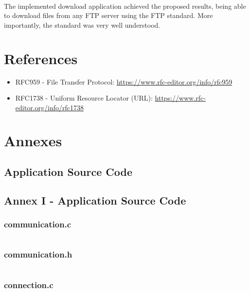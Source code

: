 \documentclass[11pt]{article}
\begin{document}
\paragraph{}The implemented download application achieved the proposed results, being able to download files from any FTP server using the FTP standard. More importantly, the standard was very well understood.

\section*{References}

\begin{itemize}
    \item{RFC959 - File Transfer Protocol: \url{https://www.rfc-editor.org/info/rfc959}}
    \item{RFC1738 - Uniform Resource Locator (URL): \url{https://www.rfc-editor.org/info/rfc1738}}
\end{itemize}

\section*{Annexes}

\subsection*{Application Source Code}

\subsection*{Annex I - Application Source Code}

\subsubsection*{communication.c}

\inputminted{c}{communication.c}

\newpage

\subsubsection*{communication.h}

\inputminted{c}{communication.h}

\newpage

\subsubsection*{connection.c}
\end{document}
